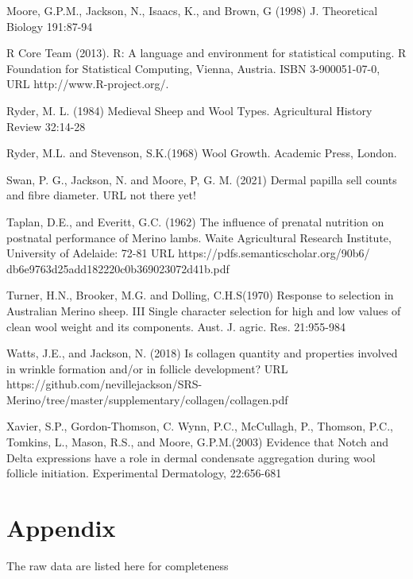 \documentclass[titlepage]{article}  %
\begin{document}
\begin{thebibliography}{}
Moore, G.P.M., Jackson, N., Isaacs, K., and Brown, G (1998) J. Theoretical Biology 191:87-94

R Core Team (2013). R: A language and environment for statistical
  computing. R Foundation for Statistical Computing, Vienna, Austria.
  ISBN 3-900051-07-0, URL http://www.R-project.org/.

Ryder, M. L. (1984) Medieval Sheep and Wool Types.  Agricultural History Review 32:14-28

Ryder, M.L. and Stevenson, S.K.(1968) Wool Growth. Academic Press, London.

Swan, P. G., Jackson, N. and Moore, P, G. M. (2021) Dermal papilla sell counts and fibre diameter. URL  not there yet!

Taplan, D.E., and Everitt, G.C. (1962) The influence of prenatal nutrition on postnatal performance of Merino lambs. Waite Agricultural Research Institute, University of Adelaide: 72-81
URL https://pdfs.semanticscholar.org/90b6/
db6e9763d25add182220c0b369023072d41b.pdf

Turner, H.N., Brooker, M.G. and Dolling, C.H.S(1970) Response to selection in Australian Merino sheep. III Single character selection for high and low values of clean wool weight and its components. Aust. J. agric. Res. 21:955-984

Watts, J.E., and Jackson, N. (2018) Is collagen quantity and properties involved in wrinkle formation and/or in follicle development? URL https://github.com/nevillejackson/SRS-Merino/tree/master/supplementary/collagen/collagen.pdf

Xavier, S.P., Gordon-Thomson, C. Wynn, P.C., McCullagh, P., Thomson, P.C., Tomkins, L., Mason, R.S., and Moore, G.P.M.(2003) Evidence that Notch and Delta expressions have a role in dermal condensate aggregation during wool follicle initiation. Experimental Dermatology, 22:656-681

\end{thebibliography}

\appendix
\section{Appendix}
The raw data are listed here for completeness
\end{document}
